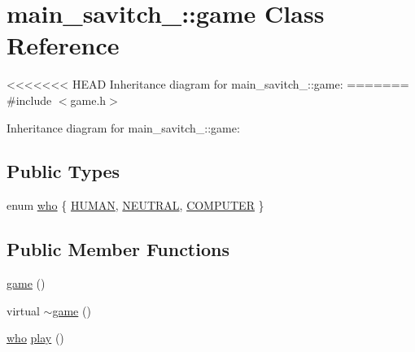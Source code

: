 \hypertarget{classmain__savitch__14_1_1game}{}\section{main\+\_\+savitch\+\_\+:\+:game Class Reference}
\label{classmain__savitch__14_1_1game}


<<<<<<< HEAD
Inheritance diagram for main\+\_\+savitch\+\_\+:\+:game\+:
=======
{\ttfamily \#include $<$game.\+h$>$}



Inheritance diagram for main\+\_\+savitch\+\_\+:\+:game\+:
\subsection*{Public Types}
\begin{DoxyCompactItemize}
\item 
enum \hyperlink{classmain__savitch__14_1_1game_a4fe20fb287f809ae2b68e28e4ccba634}{who} \{ \hyperlink{classmain__savitch__14_1_1game_a4fe20fb287f809ae2b68e28e4ccba634ad1ab8515b7d878438d60ec785343b305}{H\+U\+M\+AN}, 
\hyperlink{classmain__savitch__14_1_1game_a4fe20fb287f809ae2b68e28e4ccba634af05e1639d5a0101703a1e178cf5ba666}{N\+E\+U\+T\+R\+AL}, 
\hyperlink{classmain__savitch__14_1_1game_a4fe20fb287f809ae2b68e28e4ccba634a983c07bd1a5606dd31a0fd6a6b86b36b}{C\+O\+M\+P\+U\+T\+ER}
 \}
\end{DoxyCompactItemize}
\subsection*{Public Member Functions}
\begin{DoxyCompactItemize}
\item 
\hyperlink{classmain__savitch__14_1_1game_a65afffa6f5aa8dcd781ad38f898130e0}{game} ()
\item 
virtual \hyperlink{classmain__savitch__14_1_1game_a5e8d21d1d658a12db6fddacca3490671}{$\sim$game} ()
\item 
\hyperlink{classmain__savitch__14_1_1game_a4fe20fb287f809ae2b68e28e4ccba634}{who} \hyperlink{classmain__savitch__14_1_1game_a4dbeaddb78059f7c5dcbf5cc4e026317}{play} ()
\end{DoxyCompactItemize}
